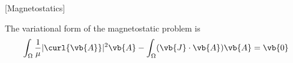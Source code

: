 \documentclass{notes}
\begin{document}
\author{Michael Haynes}
[Magnetostatics]
\date{2020-12-28}
\maketitle

\begin{proposition}
				The variational form of the magnetostatic problem is
				\[
					\int_{ \Omega }^{  }  \dfrac{1}{\mu} |\curl{\vb{A}}|^2 \vb{A} - \int_{ \Omega }^{  } (\vb{J} \cdot \vb{A}) \vb{A} = \vb{0} 
				\] 
				
\end{proposition}
\end{document}
